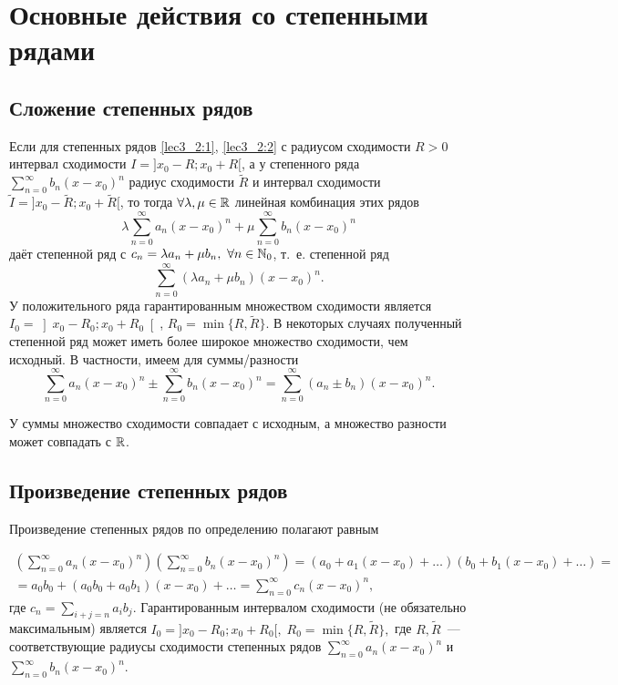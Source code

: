 \documentclass[../../main.tex]{subfiles}
\begin{document}
    \section{Основные действия со степенными рядами}
    \subsection{Сложение степенных рядов}
    
    Если для степенных рядов \eqref{lec3_2:1}, \eqref{lec3_2:2}  с радиусом 
    сходимости $R > 0$ интервал сходимости $I = ]x_0-R; x_0 + R[$, а у 
    степенного ряда $\sum\limits_{n = 0}^{\infty} b_n(x-x_0)^n$ радиус 
    сходимости $\widetilde R$ и интервал сходимости $\widetilde I = 
    ]x_0-\widetilde R; x_0 + \widetilde R[$, то тогда $\forall \lambda, \mu 
    \in 
    \mathbb{R}$ линейная комбинация этих рядов
    \[\lambda \sum\limits_{n = 0}^{\infty}a_n(x-x_0)^n + \mu 
    \sum\limits_{n = 0}^{\infty} b_n(x-x_0)^n \]
    даёт степенной ряд с $c_n = \lambda a_n + \mu b_n, \  \forall n \in 
    \mathbb{N}_0$, т.~е. степенной ряд
    \[ \sum\limits_{n = 0}^{\infty}(\lambda a_n + \mu b_n)(x-x_0)^n. \]
    У положительного ряда гарантированным множеством сходимости является 
    $I_0 = \left]x_0-R_0; x_0 + R_0\right[$, $R_0 = \min \{R, \widetilde R\}$. 
    В 
    некоторых случаях полученный степенной ряд может иметь более широкое 
    множество сходимости, чем исходный. В частности, имеем для суммы/разности
    \[ \sum\limits_{n = 0}^{\infty}a_n(x-x_0)^n \pm 
    \sum\limits_{n = 0}^{\infty}b_n(x-x_0)^n = 
    \sum\limits_{n = 0}^{\infty}(a_n \pm b_n) (x-x_0)^n.  \]

    У суммы множество сходимости совпадает с исходным, а множество разности 
    может совпадать с $\mathbb{R}$.
    
    \subsection{Произведение степенных рядов}
    Произведение степенных рядов по определению полагают равным

    \begin{multline*}
        \left( \sum\limits_{n = 0}^{\infty}a_n(x-x_0)^n \right)
        \left( \sum\limits_{n = 0}^{\infty}b_n(x-x_0)^n \right) = 
        (a_0 + a_1(x - x_0) + \ldots)(b_0 + b_1(x - x_0) + \ldots) =
        \\ = a_0b_0 + (a_0b_0 + a_0b_1)(x - x_0) + \ldots = 
        \sum\limits_{n = 0}^{\infty}c_n(x-x_0)^n, 
    \end{multline*}
    где $c_n = \sum\limits_{i + j = n} a_ib_j$. Гарантированным интервалом 
    сходимости (не обязательно максимальным) является $I_0 = ]x_0-R_0; x_0 + 
    R_0[, \; R_0 = \min \{R, \widetilde R\},$ где $R, \widetilde R$~--- 
    соответствующие радиусы сходимости степенных рядов $\sum\limits_{n = 0}^
    {\infty}a_n(x-x_0)^n$ и $\sum\limits_{n = 0}^{\infty}b_n(x-x_0)^n$.
    
\end{document}
